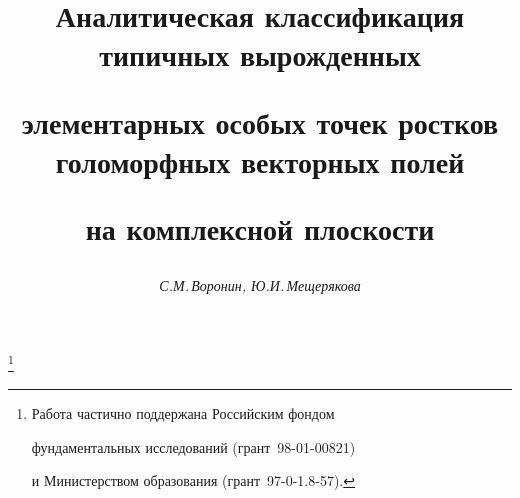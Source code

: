 









\newcommand{\V}{{\cal V}}


\newcommand{\tts}[1]{}







\setcounter{page}{13}















\author{\it С.М.\,Воронин, Ю.И.\,Мещерякова}




\title{Аналитическая классификация типичных вырожденных


элементарных особых точек ростков голоморфных векторных полей


на комплексной плоскости}


\thanks{Работа частично поддержана Российским фондом


фундаментальных исследований (грант \No\,98-01-00821)


и Министерством образования (грант \No\,97-0-1.8-57).}





\date{}




\pagestyle{plain} %







